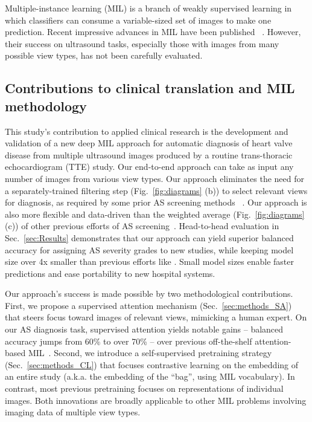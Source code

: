 Multiple-instance learning (MIL) is a branch of weakly supervised learning in which classifiers can consume a variable-sized set of images to make one prediction.
Recent impressive advances in MIL have been published ~\citep{ilse2018attention, lee2019set, sharma2021cluster, shao2021transmil}. 
However, their success on ultrasound tasks, especially those with images from many possible view types, has not been carefully evaluated.

\subsection*{Contributions to clinical translation and MIL methodology}
This study's contribution to applied clinical research is the development and validation of a new deep MIL approach for automatic diagnosis of heart valve disease from multiple ultrasound images produced by a  routine trans-thoracic echocardiogram (TTE) study. 
Our end-to-end approach can take as input any number of images from various view types. Our approach eliminates the need for a separately-trained filtering step (Fig.~\ref{fig:diagrams} (b)) to select relevant views for diagnosis, as required by some prior AS screening methods ~\citep{holste2022automated}. Our approach is also more flexible and data-driven than the weighted average (Fig.~\ref{fig:diagrams} (c)) of other previous efforts of AS screening~\citep{huang2021new,wessler2023automated}.
Head-to-head evaluation in Sec.~\ref{sec:Results} demonstrates that our approach can yield superior balanced accuracy for assigning AS severity grades to new studies, while keeping model size over 4x smaller than previous efforts like \citep{holste2022automated}.
Small model sizes enable faster predictions and ease portability to new hospital systems.

Our approach's success is made possible by two methodological contributions. %
First, we propose a supervised attention mechanism (Sec.~\ref{sec:methods_SA}) that steers focus toward images of relevant views, mimicking a human expert.
On our AS diagnosis task, supervised attention yields notable gains -- balanced accuracy jumps from 60\% to over 70\% -- over previous off-the-shelf attention-based MIL~\citep{ilse2018attention}.
Second, we introduce a self-supervised pretraining strategy (Sec.~\ref{sec:methods_CL}) that focuses contrastive learning on the embedding of an entire study (a.k.a. the embedding of the ``bag'', using MIL vocabulary). In contrast, most previous pretraining focuses on representations of individual images.
Both innovations are broadly applicable to other MIL problems involving imaging data of multiple view types.

